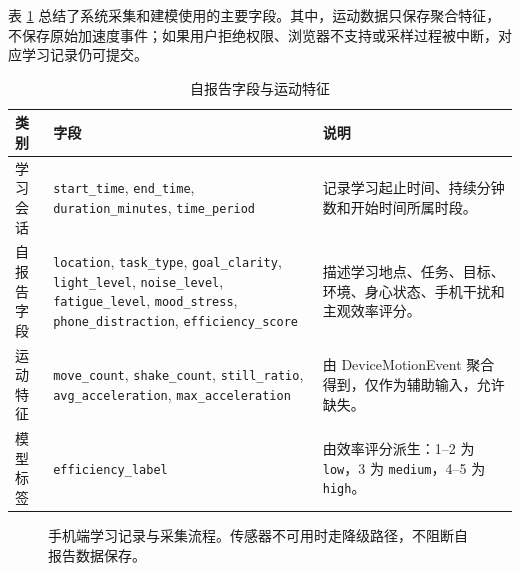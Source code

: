 \documentclass[UTF8,a4paper,fontset=fandol]{ctexart}
\begin{document}
表 \ref{tab:features} 总结了系统采集和建模使用的主要字段。其中，运动数据只保存聚合特征，不保存原始加速度事件；如果用户拒绝权限、浏览器不支持或采样过程被中断，对应学习记录仍可提交。

\begin{table}[htbp]
  \centering
  \caption{自报告字段与运动特征}
  \label{tab:features}
  \small
  \begin{tabularx}{0.95\textwidth}{p{2.4cm}p{6.7cm}X}
    \toprule
    类别 & 字段 & 说明 \\
    \midrule
    学习会话 & \texttt{start\_time}, \texttt{end\_time}, \texttt{duration\_minutes}, \texttt{time\_period} & 记录学习起止时间、持续分钟数和开始时间所属时段。 \\
    自报告字段 & \texttt{location}, \texttt{task\_type}, \texttt{goal\_clarity}, \texttt{light\_level}, \texttt{noise\_level}, \texttt{fatigue\_level}, \texttt{mood\_stress}, \texttt{phone\_distraction}, \texttt{efficiency\_score} & 描述学习地点、任务、目标、环境、身心状态、手机干扰和主观效率评分。 \\
    运动特征 & \texttt{move\_count}, \texttt{shake\_count}, \texttt{still\_ratio}, \texttt{avg\_acceleration}, \texttt{max\_acceleration} & 由 DeviceMotionEvent 聚合得到，仅作为辅助输入，允许缺失。 \\
    模型标签 & \texttt{efficiency\_label} & 由效率评分派生：1--2 为 \texttt{low}，3 为 \texttt{medium}，4--5 为 \texttt{high}。 \\
    \bottomrule
  \end{tabularx}
\end{table}

\begin{figure}[htbp]
  \centering
  \caption{手机端学习记录与采集流程。传感器不可用时走降级路径，不阻断自报告数据保存。}
  \label{fig:collection}
\end{figure}
\end{document}
